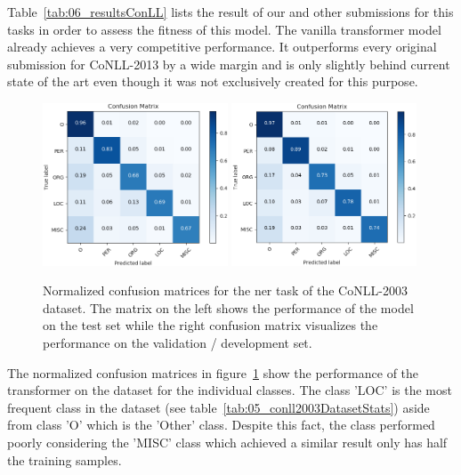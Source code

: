 \bigskip
Table~\ref{tab:06_resultsConLL} lists the result of our and other submissions for this tasks in order to assess the fitness of this model. The vanilla transformer model already achieves a very competitive performance. It outperforms every original submission for CoNLL-2013 by a wide margin and is only slightly behind current state of the art \cite{Baevski2019} even though it was not exclusively created for this purpose.
\medskip

\begin{figure}[ht]
	\centering
	\includegraphics[width=0.49\textwidth]{figures/06_results/06_ner_final_test_c_matrix}
	\includegraphics[width=0.49\textwidth]{figures/06_results/06_ner_final_valid_c_matrix}
	\caption{Normalized confusion matrices for the \gls{ner} task of the CoNLL-2003 dataset. The matrix on the left shows the performance of the model on the test set while the right confusion matrix visualizes the performance on the validation / development set.}
	\label{fig:06_NER_cmatrices}
\end{figure}

The normalized confusion matrices in figure~\ref{fig:06_NER_cmatrices} show the performance of the transformer on the dataset for the individual classes. The class 'LOC' is the most frequent class in the dataset {(see table~\ref{tab:05_conll2003DatasetStats})} aside from class 'O' which is the 'Other' class. Despite this fact, the class performed poorly considering the 'MISC' class which achieved a similar result only has half the training samples.



